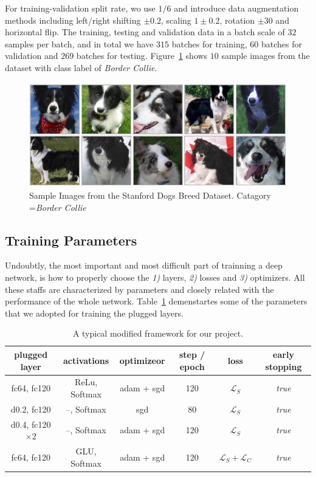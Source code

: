 \documentclass{article}
\begin{document}
For training-validation split rate, wo use $1/6$ and introduce data augmentation methods including left/right shifting $\pm 0.2$, scaling $1 \pm 0.2$, rotation $\pm 30$ and horizontal flip. 
The training, testing and validation data in a batch scale of $32$ samples per batch, and in total we have $315$ batches for training, $60$ batches for validation and $269$ batches for testing. Figure~\ref{fig:5} shows $10$ sample images from the dataset with class label of \emph{Border Collie}. 

\begin{figure}[H]
	\centering
	\includegraphics[width=0.7\linewidth]{pics/dogs} 
	\caption{Sample Images from the Stanford Dogs Breed Dataset. Catagory =\emph{Border Collie} }
	\label{fig:5}
\end{figure}

\subsection{Training Parameters}
Undoubtly, the most important and most difficult part of trainning a deep network, is how to properly choose the \emph{1)} layers, \emph{2)} losses and \emph{3)} optimizers. All these staffs are characterized by parameters and closely related with the performance of the whole network. 
Table~\ref{tab:2} demenstartes some of the parameters that we adopted for training the plugged layers. 

\begin{table}[h]
	\centering
	\caption{A typical modified framework for our project.}
	\label{tab:2}
	\begin{tabular}{c|ccccc}
		\toprule
		 plugged layer & activations & optimizeor & step / epoch & loss & early stopping\\ 
		\midrule
		 fc64, fc120 & ReLu, Softmax & adam + sgd & 120 & $\mathcal{L}_S$ & \emph{true} \\ 
		 d0.2, fc120 & --, Softmax & sgd & 80 & $\mathcal{L}_S$ & \emph{true} \\ 
		 d0.4, fc120$\times$2 & --, Softmax & adam + sgd & 120 & $\mathcal{L}_S$ & \emph{true} \\
		 fc64, fc120 & GLU, Softmax & adam + sgd & 120  & $\mathcal{L}_S + \mathcal{L}_C$ & \emph{true} \\ 
		\bottomrule
	\end{tabular}
\end{table}
\end{document}
